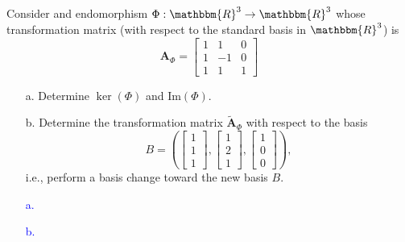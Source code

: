 \documentclass[a4paper,12pt]{article}
\newcommand{\R}{\mathbbm{R}}
\newcommand{\M}[1]{ \begin{bmatrix} #1 \end{bmatrix} }
\newcommand{\matA}{\textbf{A}}
\newcommand{\image}{\textrm{Im}}
\begin{document}
\subsection{}
Consider and endomorphism $\Phi: \R^3 \rightarrow \R^3$ whose transformation matrix (with respect to the standard basis in $\R ^3$) is
$$\matA_\Phi = \M{1&1&0\\1&-1&0\\1&1&1}$$
\begin{itemize}
 \item [a.] Determine $\ker(\Phi)$ and $\image(\Phi)$.
 \item [b.] Determine the transformation matrix $\tilde{\matA}_\Phi$ with respect to the basis
 $$B = \left( \M{1\\1\\1}, \M{1\\2\\1}, \M{1\\0\\0} \right),$$
 i.e., perform a basis change toward the new basis $B$.
\end{itemize}
\textcolor{blue}{
\begin{itemize}
 \item [a.]
 \item [b.]
\end{itemize}
}
\end{document}
